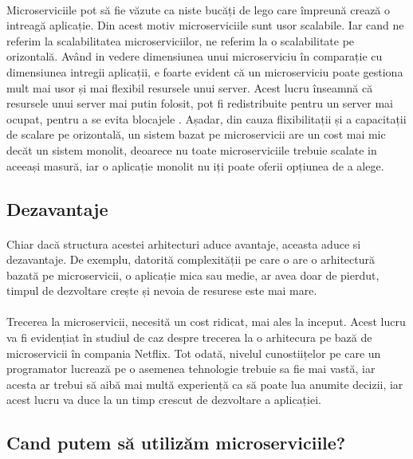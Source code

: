 \documentclass[12pt]{report}
\begin{document}
  	\paragraph{}Microserviciile pot să fie văzute ca niste bucăți de lego care împreună crează o intreagă aplicație. Din acest motiv microserviciile sunt usor scalabile. Iar cand ne referim la scalabilitatea microserviciilor, ne referim la o scalabilitate pe orizontală. Având in vedere dimensiunea unui microserviciu în comparație cu dimensiunea intregii aplicații, e foarte evident că un microserviciu poate gestiona mult mai usor și mai flexibil resursele unui server. Acest lucru înseamnă că resursele unui server mai putin folosit, pot fi redistribuite pentru un server mai ocupat, pentru a se evita blocajele \cite{singleton2016economics}. Așadar, din cauza flixibilitații și a capacitații de scalare pe orizontală, un sistem bazat pe microservicii are un cost mai mic decăt un sistem monolit, deoarece nu toate microserviciile trebuie scalate in aceeași masură, iar o aplicație monolit nu iți poate oferii opțiunea de a alege. \cite{newman2015building}
  	\subsection{Dezavantaje}
  	\paragraph{}Chiar dacă structura acestei arhitecturi aduce avantaje, aceasta aduce si dezavantaje. De exemplu, datorită complexității pe care o are o arhitectură bazată pe microservicii, o aplicație mica sau medie, ar avea doar de pierdut, timpul de dezvoltare crește și nevoia de resurese este mai mare.
  	\paragraph{}Trecerea la microservicii, necesită un cost ridicat, mai ales la inceput. Acest lucru va fi evidențiat în studiul de caz despre trecerea la o arhitecura pe bază de microservicii în compania Netflix. Tot odată, nivelul cunostiițelor pe care un programator lucrează pe o asemenea tehnologie trebuie sa fie mai vastă, iar acesta ar trebui să aibă mai multă experiență ca să poate lua anumite decizii, iar acest lucru va duce la un timp crescut de dezvoltare a aplicației.
  	\subsection{Cand putem să utilizăm microserviciile?}
\end{document}
